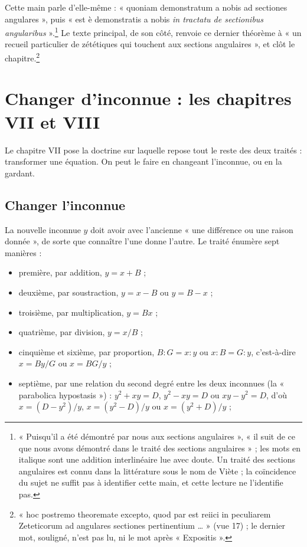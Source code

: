 \documentclass[11pt,a4paper]{article}
\begin{document}
Cette main parle d'elle-même : « quoniam demonstratum a nobis ad sectiones
angulares », puis « est è demonstratis a nobis \emph{in tractatu de sectionibus
angularibus} ».\footnote{« Puisqu'il a été démontré par nous aux sections
angulaires », « il suit de ce que nous avons démontré dans le traité des
sections angulaires » ; les mots en italique sont une addition interlinéaire lue
avec doute. Un traité des sections angulaires est connu dans la littérature
sous le nom de Viète ; la coïncidence du sujet ne suffit pas à identifier cette
main, et cette lecture ne l'identifie pas.} Le texte principal, de son côté,
renvoie ce dernier théorème à « un recueil particulier de zététiques qui
touchent aux sections angulaires », et clôt le chapitre.\footnote{« hoc postremo
theoremate excepto, quod par est reiici in peculiarem Zeteticorum ad angulares
sectiones pertinentium \ldots{} » (vue 17) ; le dernier mot, souligné, n'est pas
lu, ni le mot après « Expositis ».}

\section*{Changer d'inconnue : les chapitres VII et VIII}

Le chapitre VII pose la doctrine sur laquelle repose tout le reste des deux
traités : transformer une équation. On peut le faire en changeant l'inconnue,
ou en la gardant.

\subsection*{Changer l'inconnue}

La nouvelle inconnue $y$ doit avoir avec l'ancienne « une différence ou une
raison donnée », de sorte que connaître l'une donne l'autre. Le traité énumère
sept manières :

\begin{itemize}
  \item première, par addition, $y = x + B$ ;
  \item deuxième, par soustraction, $y = x - B$ ou $y = B - x$ ;
  \item troisième, par multiplication, $y = Bx$ ;
  \item quatrième, par division, $y = x/B$ ;
  \item cinquième et sixième, par proportion, $B : G = x : y$ ou
    $x : B = G : y$, c'est-à-dire $x = By/G$ ou $x = BG/y$ ;
  \item septième, par une relation du second degré entre les deux inconnues
    (la « parabolica hypostasis ») : $y^2 + xy = D$, $y^2 - xy = D$ ou
    $xy - y^2 = D$, d'où $x = (D - y^2)/y$, $x = (y^2 - D)/y$ ou
    $x = (y^2 + D)/y$ ;
\end{itemize}
\end{document}
